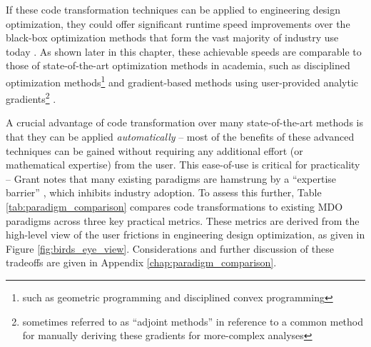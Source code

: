 If these code transformation techniques can be applied to engineering design optimization, they could offer significant runtime speed improvements over the black-box optimization methods that form the vast majority of industry use today \cite{martins_engineering_2021, lavin_simulation_2022}. As shown later in this chapter, these achievable speeds are comparable to those of state-of-the-art optimization methods in academia, such as disciplined optimization methods\footnote{such as geometric programming and disciplined convex programming} \cite{grant_disciplined_2006, gpkit, boyd_convex_2004, agrawal_disciplined_2019} and gradient-based methods using user-provided analytic gradients\footnote{sometimes referred to as ``adjoint methods'' in reference to a common method for manually deriving these gradients for more-complex analyses} \cite{gray_openmdao_2019, kenway_effective_2019, innes_don_2019}.

A crucial advantage of code transformation over many state-of-the-art methods is that they can be applied \textit{automatically} -- most of the benefits of these advanced techniques can be gained without requiring any additional effort (or mathematical expertise) from the user. This ease-of-use is critical for practicality -- Grant notes that many existing paradigms are hamstrung by a ``expertise barrier'' \cite{grant_disciplined_2006}, which inhibits industry adoption. To assess this further, Table \ref{tab:paradigm_comparison} compares code transformations to existing MDO paradigms across three key practical metrics. These metrics are derived from the high-level view of the user frictions in engineering design optimization, as given in Figure \ref{fig:birds_eye_view}. Considerations and further discussion of these tradeoffs are given in Appendix \ref{chap:paradigm_comparison}.

